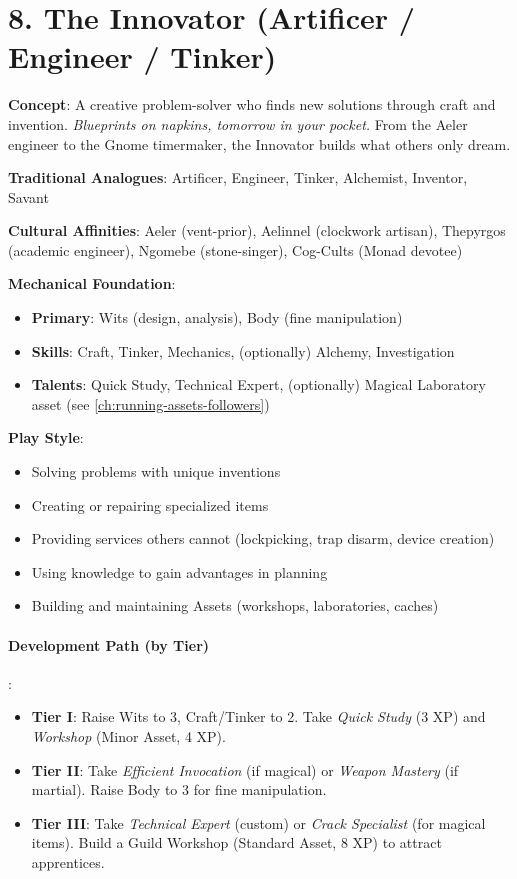 \section{8. The Innovator (Artificer / Engineer / Tinker)}
\label{sec:concept-innovator}

\textbf{Concept}: A creative problem-solver who finds new solutions through craft and invention. \emph{Blueprints on napkins, tomorrow in your pocket.} From the Aeler engineer to the Gnome timermaker, the Innovator builds what others only dream.

\textbf{Traditional Analogues}: Artificer, Engineer, Tinker, Alchemist, Inventor, Savant

\textbf{Cultural Affinities}: Aeler (vent-prior), Aelinnel (clockwork artisan), Thepyrgos (academic engineer), Ngomebe (stone-singer), Cog-Cults (Monad devotee)

\textbf{Mechanical Foundation}:
\begin{itemize}
\item \textbf{Primary}: Wits (design, analysis), Body (fine manipulation)
\item \textbf{Skills}: Craft, Tinker, Mechanics, (optionally) Alchemy, Investigation
\item \textbf{Talents}: Quick Study, Technical Expert, (optionally) Magical Laboratory asset (see \ref{ch:running-assets-followers})
\end{itemize}

\textbf{Play Style}:
\begin{itemize}
\item Solving problems with unique inventions
\item Creating or repairing specialized items
\item Providing services others cannot (lockpicking, trap disarm, device creation)
\item Using knowledge to gain advantages in planning
\item Building and maintaining Assets (workshops, laboratories, caches)
\end{itemize}

\paragraph{Development Path (by Tier)}:
\begin{itemize}
\item \textbf{Tier I}: Raise Wits to 3, Craft/Tinker to 2. Take \emph{Quick Study} (3 XP) and \emph{Workshop} (Minor Asset, 4 XP).
\item \textbf{Tier II}: Take \emph{Efficient Invocation} (if magical) or \emph{Weapon Mastery} (if martial). Raise Body to 3 for fine manipulation.
\item \textbf{Tier III}: Take \emph{Technical Expert} (custom) or \emph{Crack Specialist} (for magical items). Build a Guild Workshop (Standard Asset, 8 XP) to attract apprentices.
\end{itemize}

